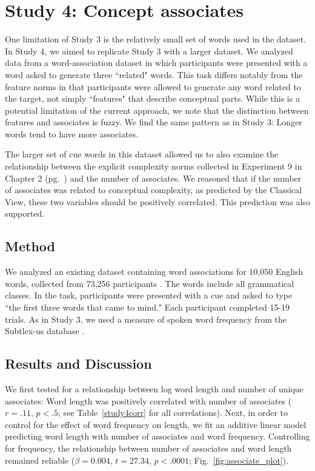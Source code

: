 \section{Study 4: Concept associates}
One limitation of Study 3 is the relatively small set of words used in the dataset. In Study 4, we aimed to replicate Study 3 with a larger dataset. We analyzed data from a word-association dataset in which participants were presented with a word asked to generate three ``related" words. This task differs notably from the feature norms in that participants were allowed to generate any word related to the target, not simply ``features" that describe conceptual parts. While this is a potential limitation of the current approach, we note that the distinction between features and associates is fuzzy. We find  the same pattern as in Study 3: Longer words tend to have more associates. 

The larger set of cue words in this dataset allowed us to also examine the relationship between the explicit complexity norms collected in  Experiment 9 in Chapter 2 (pg.\ \pageref{ch2-9}) and the number of associates. We reasoned that if the number of associates was related to conceptual complexity, as predicted by the Classical View,  these two variables should be positively correlated. This prediction was also supported.

\subsection{Method}
We analyzed an existing dataset containing word associations for  10,050 English words, collected from 73,256 participants \cite{de2013better}. The words include all grammatical classes. In the task, participants were presented with a cue and  asked to type ``the first  three words that came to mind." Each participant completed 15-19 trials. As in Study 3, we used a measure of spoken word frequency from the Subtlex-us database \cite{brysbaert2009moving}. 

\subsection{Results and Discussion}
We first tested for a relationship between log word length and number of unique associates: Word length was positively correlated with number of associates ($r = .11$, $p< .5$; see Table~\ref{study4corr} for all correlations).  Next, in order to control for the effect of word frequency on length, we fit an additive linear model predicting word length with number of associates and word frequency. Controlling for frequency, the relationship between number of associates and word length remained reliable ($\beta=0.004$, $t =27.34$, $p<.0001$; Fig.\ \ref{fig:associate_plot}).

